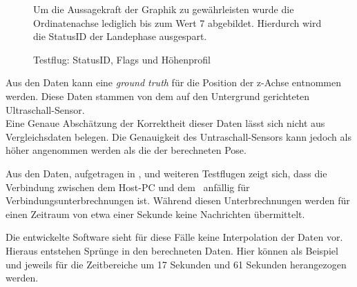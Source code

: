 \begin{figure}[ht!]
\vspace{0.25cm}
\begin{center}
\caption{Testflug: StatusID, Flags und Höhenprofil}
\label{fig:FlightStatus}
\end{center}

\vspace{0.25cm}
Um die Aussagekraft der Graphik zu gewährleisten wurde die Ordinatenachse lediglich bis zum Wert 7 abgebildet. Hierdurch wird die StatusID der Landephase ausgespart.
\end{figure}

Aus den Daten kann eine \textit{ground truth} für die Position der z-Achse entnommen werden. Diese Daten stammen von dem auf den Untergrund gerichteten Ultraschall-Sensor.\\
Eine Genaue Abschätzung der Korrektheit dieser Daten lässt sich nicht aus Vergleichsdaten belegen. Die Genauigkeit des Untraschall-Sensors kann jedoch als höher angenommen werden als die der berechneten Pose.


\FloatBarrier
{}








Aus den Daten, aufgetragen in , und weiteren Testflugen zeigt sich, dass die Verbindung zwischen dem Host-PC und dem \Quad\ anfällig für Verbindungsunterbrechnungen ist. Während diesen Unterbrechnungen werden für einen Zeitraum von etwa einer Sekunde keine Nachrichten übermittelt. 

Die entwickelte Software sieht für diese Fälle keine Interpolation der Daten vor. Hieraus entstehen Sprünge in den berechneten Daten. Hier können als Beispiel  und  jeweils für die Zeitbereiche um 17 Sekunden und 61 Sekunden herangezogen werden.







